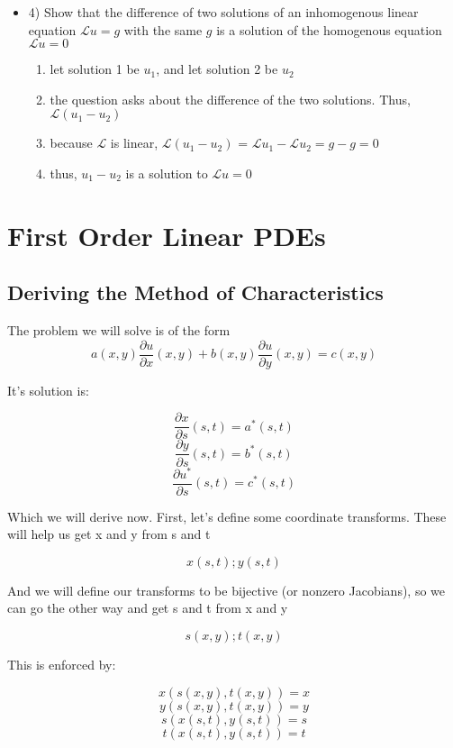 \documentclass{article}
\begin{document}
\begin{itemize}
\item 4) Show that the difference of two solutions of an inhomogenous linear equation $\mathcal{L} u = g$ with the same $g$ is a solution of the homogenous equation $\mathcal{L} u =0$

\begin{enumerate}
    \item let solution 1 be $u_1$, and let solution 2 be $u_2$
    \item the question asks about the difference of the two solutions. Thus, $\mathcal{L} \left( u_1 - u_2 \right)$
    \item because $\mathcal{L}$ is linear, $\mathcal{L} \left( u_1 - u_2 \right)$ = $\mathcal{L}  u_1 - \mathcal{L}  u_2 = g - g = 0$
    \item thus, $u_1 - u_2$ is a solution to $\mathcal{L} u =0$
    
\end{enumerate}

\end{itemize}
\newpage
\section{First Order Linear PDEs}

\subsection{Deriving the Method of Characteristics}



The problem we will solve is of the form 
$$ a(x,y) \frac{\partial u}{\partial x}(x,y) + b(x,y) \frac{\partial u}{\partial y}(x,y) = c(x,y)$$

It's solution is:

$$\frac{\partial x}{\partial s}(s,t) = a^*(s,t)$$
$$\frac{\partial y}{\partial s}(s,t) = b^*(s,t)$$
$$ \frac{\partial u^*}{\partial s}(s,t) = c^*(s,t)$$

Which we will derive now. First, let's define some coordinate transforms.  These will help us get x and y from s and t

$$x(s,t); y(s,t)$$

And we will define our transforms to be bijective (or nonzero Jacobians), so we can go the other way and get s and t from x and y

$$s(x,y); t(x,y)$$

This is enforced by:

$$ x(s(x,y),t(x,y)) = x $$
$$ y(s(x,y),t(x,y)) = y$$
$$s(x(s,t),y(s,t)) = s $$
$$ t(x(s,t),y(s,t)) = t$$
\end{document}
